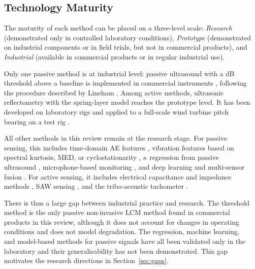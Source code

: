 \subsection{Technology Maturity}
\label{subsec:comp_maturity}

The maturity of each method can be placed on a three-level scale: \textit{Research} (demonstrated only in controlled laboratory conditions), \textit{Prototype} (demonstrated on industrial components or in field trials, but not in commercial products), and \textit{Industrial} (available in commercial products or in regular industrial use).

Only one passive method is at industrial level: passive ultrasound with a dB threshold above a baseline is implemented in commercial instruments \cite{ue_systems_ultraprobe_2026,ue_systems_ultra-trak_2026,skf_ultrasound_2026}, following the procedure described by Lineham \cite{lineham_ultrasonic_2008}. Among active methods, ultrasonic reflectometry with the spring-layer model reaches the prototype level. It has been developed on laboratory rigs \cite{dwyer-joyce_measurement_2003,chen_evaluation_2023} and applied to a full-scale wind turbine pitch bearing on a test rig \cite{li_lubrication_2026}.

All other methods in this review remain at the research stage. For passive sensing, this includes time-domain AE features \cite{miettinen_analysis_2001,cornel_condition_2021,hou_-situ_2025,delft_university_of_technology_tu_delft_influence_2024}, vibration features based on spectral kurtosis, MED, or cyclostationarity \cite{jakobsen_vibration_2021,xu_vibration-based_2024,boskoski_detection_2010}, $\kappa$ regression from passive ultrasound \cite{jakobsen_detecting_2023}, microphone-based monitoring \cite{georgiev_microphone_2017}, and deep learning and multi-sensor fusion \cite{zhang_interpretable_2026,zhang_graph-data-based_2024}. For active sensing, it includes electrical capacitance and impedance methods \cite{cen_ehl_2021,becker-dombrowsky_electrical_2024,schneider_method_2022}, SAW sensing \cite{lindner_a23_2011}, and the tribo-acoustic tachometer \cite{tatzgern_tribo-acoustic_2025}.

There is thus a large gap between industrial practice and research. The threshold method is the only passive non-invasive LCM method found in commercial products in this review, although it does not account for changes in operating conditions and does not model degradation. The regression, machine learning, and model-based methods for passive signals have all been validated only in the laboratory and their generalisability has not been demonstrated. This gap motivates the research directions in Section~\ref{sec:gaps}.
